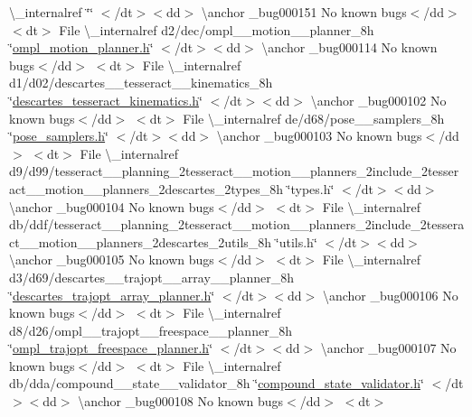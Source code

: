 \begin{DoxyRefList}
 \textbackslash{}\+\_\+internalref  \char`\"{}\char`\"{} $<$/dt$>$$<$dd$>$ \textbackslash{}anchor \+\_\+bug000151 No known bugs$<$/dd$>$ $<$dt$>$
\+File \textbackslash{}\+\_\+internalref d2/dec/ompl\+\_\+\+\_\+motion\+\_\+\+\_\+planner\+\_\+8h \char`\"{}\mbox{\hyperlink{ompl__motion__planner_8h}{ompl\+\_\+motion\+\_\+planner.\+h}}\char`\"{} $<$/dt$>$$<$dd$>$ \textbackslash{}anchor \+\_\+bug000114 No known bugs$<$/dd$>$ $<$dt$>$
\+File \textbackslash{}\+\_\+internalref d1/d02/descartes\+\_\+\+\_\+tesseract\+\_\+\+\_\+kinematics\+\_\+8h \char`\"{}\mbox{\hyperlink{descartes__tesseract__kinematics_8h}{descartes\+\_\+tesseract\+\_\+kinematics.\+h}}\char`\"{} $<$/dt$>$$<$dd$>$ \textbackslash{}anchor \+\_\+bug000102 No known bugs$<$/dd$>$ $<$dt$>$
\+File \textbackslash{}\+\_\+internalref de/d68/pose\+\_\+\+\_\+samplers\+\_\+8h \char`\"{}\mbox{\hyperlink{pose__samplers_8h}{pose\+\_\+samplers.\+h}}\char`\"{} $<$/dt$>$$<$dd$>$ \textbackslash{}anchor \+\_\+bug000103 No known bugs$<$/dd$>$ $<$dt$>$
\+File \textbackslash{}\+\_\+internalref d9/d99/tesseract\+\_\+\+\_\+planning\+\_\+2tesseract\+\_\+\+\_\+motion\+\_\+\+\_\+planners\+\_\+2include\+\_\+2tesseract\+\_\+\+\_\+motion\+\_\+\+\_\+planners\+\_\+2descartes\+\_\+2types\+\_\+8h \char`\"{}types.\+h\char`\"{} $<$/dt$>$$<$dd$>$ \textbackslash{}anchor \+\_\+bug000104 No known bugs$<$/dd$>$ $<$dt$>$
\+File \textbackslash{}\+\_\+internalref db/ddf/tesseract\+\_\+\+\_\+planning\+\_\+2tesseract\+\_\+\+\_\+motion\+\_\+\+\_\+planners\+\_\+2include\+\_\+2tesseract\+\_\+\+\_\+motion\+\_\+\+\_\+planners\+\_\+2descartes\+\_\+2utils\+\_\+8h \char`\"{}utils.\+h\char`\"{} $<$/dt$>$$<$dd$>$ \textbackslash{}anchor \+\_\+bug000105 No known bugs$<$/dd$>$ $<$dt$>$
\+File \textbackslash{}\+\_\+internalref d3/d69/descartes\+\_\+\+\_\+trajopt\+\_\+\+\_\+array\+\_\+\+\_\+planner\+\_\+8h \char`\"{}\mbox{\hyperlink{descartes__trajopt__array__planner_8h}{descartes\+\_\+trajopt\+\_\+array\+\_\+planner.\+h}}\char`\"{} $<$/dt$>$$<$dd$>$ \textbackslash{}anchor \+\_\+bug000106 No known bugs$<$/dd$>$ $<$dt$>$
\+File \textbackslash{}\+\_\+internalref d8/d26/ompl\+\_\+\+\_\+trajopt\+\_\+\+\_\+freespace\+\_\+\+\_\+planner\+\_\+8h \char`\"{}\mbox{\hyperlink{ompl__trajopt__freespace__planner_8h}{ompl\+\_\+trajopt\+\_\+freespace\+\_\+planner.\+h}}\char`\"{} $<$/dt$>$$<$dd$>$ \textbackslash{}anchor \+\_\+bug000107 No known bugs$<$/dd$>$ $<$dt$>$
\+File \textbackslash{}\+\_\+internalref db/dda/compound\+\_\+\+\_\+state\+\_\+\+\_\+validator\+\_\+8h \char`\"{}\mbox{\hyperlink{compound__state__validator_8h}{compound\+\_\+state\+\_\+validator.\+h}}\char`\"{} $<$/dt$>$$<$dd$>$ \textbackslash{}anchor \+\_\+bug000108 No known bugs$<$/dd$>$ $<$dt$>$
$$
\end{DoxyRefList}
